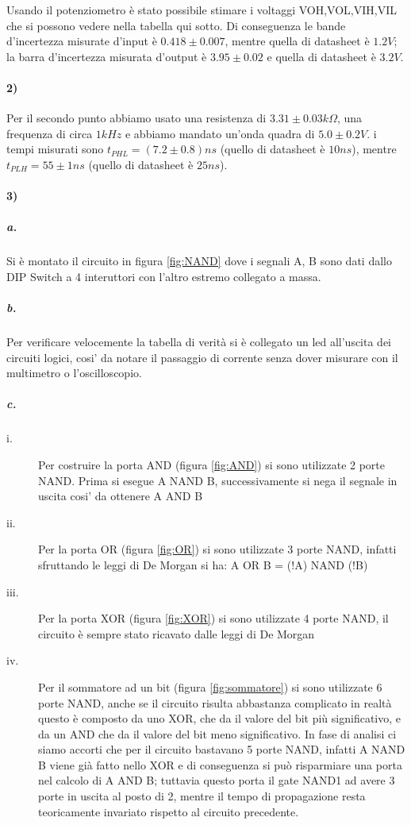\documentclass{article}
\begin{document}
	Usando il potenziometro è stato possibile stimare i voltaggi VOH,VOL,VIH,VIL che si possono vedere nella tabella qui sotto.\newline
	Di conseguenza le bande d'incertezza misurate d'input è $0.418\pm0.007$, mentre quella di datasheet è $1.2 V$; la barra d'incertezza misurata d'output è $3.95\pm0.02$ e quella di datasheet è $3.2 V$.
	\begin{center}
		
	\end{center}

\paragraph{2)}
	Per il secondo punto abbiamo usato una resistenza di $3.31\pm0.03 k\Omega$, una frequenza di circa $1kHz$ e abbiamo mandato un'onda quadra di $5.0\pm0.2 V$.
	i tempi misurati sono $t_{PHL}=(7.2\pm0.8)ns$ (quello di datasheet è $10ns$), mentre $t_{PLH}=55\pm 1 ns$ (quello di datasheet è $25ns$).
	
\paragraph{3)}
	\subparagraph{a.}
	Si è montato il circuito in figura \ref{fig:NAND} dove i segnali A, B sono dati dallo DIP Switch a 4 interuttori con l'altro estremo collegato a massa.
	\subparagraph{b.}
	Per verificare velocemente la tabella di verità si è collegato un led all'uscita dei circuiti logici, cosi' da notare il passaggio di corrente senza dover misurare con il multimetro o l'oscilloscopio.
	
	\subparagraph{c.}
	\begin{description}
		\item[i.] Per costruire la porta AND (figura \ref{fig:AND}) si sono utilizzate 2 porte NAND. Prima si esegue A NAND B, successivamente si nega il segnale in uscita cosi' da ottenere A AND B
		\item[ii.] Per la porta OR (figura \ref{fig:OR}) si sono utilizzate 3 porte NAND, infatti sfruttando le leggi di De Morgan si ha: A OR B = (!A) NAND (!B) 
		\item[iii.] Per la porta XOR (figura \ref{fig:XOR}) si sono utilizzate 4 porte NAND,  il circuito è sempre stato ricavato dalle leggi di De Morgan
		\item[iv.] Per il sommatore ad un bit (figura \ref{fig:sommatore}) si sono utilizzate 6 porte NAND, anche se il circuito risulta abbastanza complicato in realtà questo è composto  da uno XOR, che da il valore del bit più significativo, e da un AND che da il valore del bit meno significativo. In fase di analisi ci siamo accorti che per il circuito bastavano 5 porte NAND, infatti A NAND B viene già fatto nello XOR e di conseguenza si può risparmiare una porta nel calcolo di A AND B; tuttavia questo porta il gate NAND1 ad avere 3 porte in uscita al posto di 2, mentre il tempo di propagazione resta teoricamente invariato rispetto al circuito precedente.\newline
	\end{description}
\end{document}
